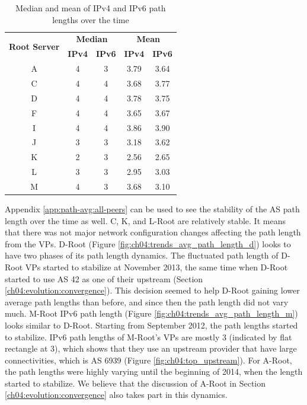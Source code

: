 
\begin{table}[!ht]
	\centering
	\begin{tabular}{c c c c c}
		\hline
		\multirow{2}{*}{\textbf{Root Server}} & \multicolumn{2}{c}{\textbf{Median}} & \multicolumn{2}{c}{\textbf{Mean}} \\
		& \textbf{IPv4} & \textbf{IPv6} & \textbf{IPv4} & \textbf{IPv6} \\
		\hline\hline
		A			& 4 & 3 & 3.79	& 3.64 \\ \hline
		C			& 4 & 4 & 3.68	& 3.77 \\ \hline
		D			& 4 & 4 & 3.78	& 3.75 \\ \hline
		F			& 4 & 4 & 3.65	& 3.67 \\ \hline
		I			& 4 & 4 & 3.86	& 3.90 \\ \hline
		J			& 3 & 3 & 3.18	& 3.62 \\ \hline
		K			& 2 & 3 & 2.56	& 2.65 \\ \hline
		L			& 3 & 3 & 2.95	& 3.03 \\ \hline
		M			& 4 & 3 & 3.68	& 3.10 \\ \hline
	\end{tabular}
	\caption{Median and mean of IPv4 and IPv6 path lengths over the time}
	\label{table:ch04:path-length-average}
\end{table}


Appendix \ref{app:path-avg:all-peers} can be used to see the stability of the AS path length over the time as well.  C, K, and L-Root are relatively stable. It means that there was not major network configuration changes affecting the path length from the VPs. D-Root (Figure \ref{fig:ch04:trends_avg_path_length_d}) looks to have two phases of its path length dynamics. The fluctuated path length of D-Root VPs started to stabilize at November 2013, the same time when D-Root started to use AS 42 as one of their upstream (Section \ref{ch04:evolution:convergence}). This decision seemed to help D-Root gaining lower average path lengths than before, and since then the path length did not vary much. M-Root IPv6 path length (Figure \ref{fig:ch04:trends_avg_path_length_m}) looks similar to D-Root. Starting from September 2012, the path lengths started to stabilize. IPv6 path lengths of M-Root's VPs are mostly 3 (indicated by flat rectangle at 3), which shows that they use an upstream provider that have large connectivities, which is AS 6939 (Figure \ref{fig:ch04:top_upstream}). For A-Root, the path lengths were highly varying until the beginning of 2014, when the length started to stabilize. We believe that the discussion of A-Root in Section \ref{ch04:evolution:convergence} also takes part in this dynamics.

